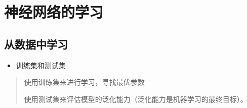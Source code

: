 \documentclass[letterpaper,10pt,english]{sphinxmanual}
\begin{document}
\begin{quote}
\begin{sphinxVerbatim}[commandchars=\\\{\}]
             
          
             
          
             
          

         

  
  \PYG{p}{[} \PYG{p}{]}
   
\end{sphinxVerbatim}
\end{quote}


\chapter{神经网络的学习}
\label{\detokenize{_u795e_u7ecf_u7f51_u7edc_u7684_u5b66_u4e60:id1}}\label{\detokenize{_u795e_u7ecf_u7f51_u7edc_u7684_u5b66_u4e60::doc}}

\section{从数据中学习}
\label{\detokenize{_u795e_u7ecf_u7f51_u7edc_u7684_u5b66_u4e60:id2}}
\begin{itemize}
\item {} 
训练集和测试集

\end{itemize}
\begin{quote}

\begin{DUlineblock}{0em}
\item[] 使用训练集来进行学习，寻找最优参数
\item[] 使用测试集来评估模型的泛化能力（泛化能力是机器学习的最终目标）。
\end{DUlineblock}
\end{quote}
\end{document}
